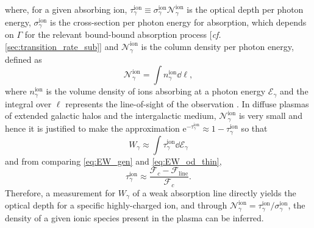where, for a given absorbing ion, $\tau^{\text{ion}}_{\gamma} \equiv \sigma^{\text{ion}}_{\gamma} \mathcal{N}^{\text{ion}}_{\gamma}$ is the optical depth per photon energy, $\sigma^{\text{ion}}_{\gamma}$ is the cross-section per photon energy for absorption, which depends on $\Gamma$ for the relevant bound-bound absorption process [\emph{cf.\@} \cref{sec:transition_rate_sub}] and $\mathcal{N}^{\text{ion}}_{\gamma}$ is the column density per photon energy, defined as 
\begin{equation}
 \mathcal{N}^{\text{ion}}_{\gamma} = \int n^{\text{ion}}_{\gamma} \dd{\ell} , 
 \end{equation}
where $n^{\text{ion}}_{\gamma}$ is the volume density of ions absorbing at a photon energy $\mathcal{E}_{\gamma}$ and the integral over $\ell$ represents the line-of-sight of the observation \cite{Carroll07}.  
In diffuse plasmas of extended galactic halos and the intergalactic medium, $\mathcal{N}^{\text{ion}}_{\gamma}$ is very small and hence it is justified to make the approximation $\mathrm{e}^{-\tau^{\text{ion}}_{\gamma}} \approx 1 - \tau^{\text{ion}}_{\gamma}$ so that %
\begin{equation}\label{eq:EW_od_thin}
 W_{\gamma} \approx \int \tau^{\text{ion}}_{\gamma} \dd{\mathcal{E}_{\gamma}}
 \end{equation} 
and from comparing \cref{eq:EW_gen} and \cref{eq:EW_od_thin}, 
\begin{equation}
 \tau^{\text{ion}}_{\gamma} \approx \frac{\mathcal{F}_c - \mathcal{F}_{\text{line}}}{\mathcal{F}_c} .
 \end{equation}
Therefore, a measurement for $W_{\gamma}$ of a weak absorption line directly yields the optical depth for a specific highly-charged ion, and through $\mathcal{N}^{\text{ion}}_{\gamma} = \tau^{\text{ion}}_{\gamma} / \sigma^{\text{ion}}_{\gamma}$, the density of a given ionic species present in the plasma can be inferred. 

